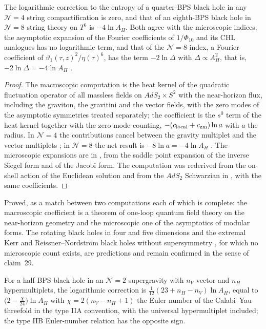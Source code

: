 \begin{theorem}[claim 28]\label{thm:logs}
The logarithmic correction to the entropy of a quarter-BPS black hole in any $\mathcal N=4$ string compactification is zero, and that of an eighth-BPS black hole in $\mathcal N=8$ string theory on $T^6$ is $-4\ln A_H$. Both agree with the microscopic indices: the asymptotic expansion of the Fourier coefficients of $1/\Phi_{10}$ and its CHL analogues has no logarithmic term, and that of the $\mathcal N=8$ index, a Fourier coefficient of $\vartheta_1(\tau,z)^2/\eta(\tau)^6$, has the term $-2\ln\Delta$ with $\Delta\propto A_H^2$, that is, $-2\ln\Delta = -4\ln A_H$ \cite{BGMS11}.
\end{theorem}

\begin{proof}
The macroscopic computation is the heat kernel of the quadratic fluctuation operator of all massless fields on $AdS_2\times S^2$ with the near-horizon flux, including the graviton, the gravitini and the vector fields, with the zero modes of the asymptotic symmetries treated separately; the coefficient is the $s^0$ term of the heat kernel together with the zero-mode counting, $-(c_{\rm local} + c_{\rm zm})\ln a$ with $a$ the radius. In $\mathcal N=4$ the contributions cancel between the gravity multiplet and the vector multiplets \cite[Section~7]{BGMS11}; in $\mathcal N=8$ the net result is $-8\ln a = -4\ln A_H$ \cite[Section~8]{BGMS11}. The microscopic expansions are in \cite[Section~2]{BGMS11}, from the saddle point expansion of the inverse Siegel form \cite{DavidSen06} and of the Jacobi form. The computation was rederived from the on-shell action of the Euclidean solution and from the $AdS_2$ Schwarzian in \cite{IMT25,IMT25b}, with the same coefficients.
\end{proof}

\begin{verdict}[claim 28]
Proved, as a match between two computations each of which is complete: the macroscopic coefficient is a theorem of one-loop quantum field theory on the near-horizon geometry and the microscopic one of the asymptotics of modular forms. The rotating black holes in four and five dimensions \cite{Sen12rotating} and the extremal Kerr and Reissner--Nordstr\"om black holes without supersymmetry \cite{Sen12N2,Sen13schwarzschild}, for which no microscopic count exists, are predictions and remain confirmed in the sense of claim~29.
\end{verdict}

\begin{proposition}\label{prop:n2log}
For a half-BPS black hole in an $\mathcal N=2$ supergravity with $n_V$ vector and $n_H$ hypermultiplets, the logarithmic correction is $\frac{1}{12}(23 + n_H - n_V)\ln A_H$, equal to $\big(2 - \frac{\chi}{24}\big)\ln A_H$ with $\chi = 2(n_V - n_H + 1)$ the Euler number of the Calabi--Yau threefold in the type IIA convention, with the universal hypermultiplet included; the type IIB Euler-number relation has the opposite sign.
\end{proposition}

